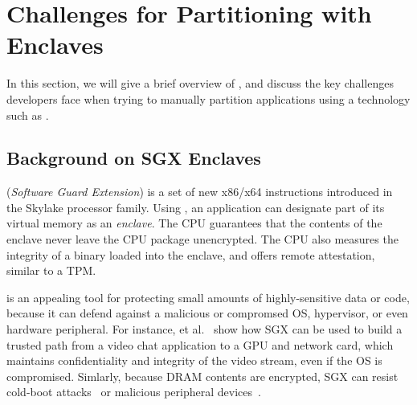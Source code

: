 \section{Challenges for Partitioning with Enclaves}
\label{sec:background}
In this section, we will give a brief overview of \sgx{}, and discuss 
the key challenges developers face when trying to manually partition applications using a technology such as \sgx{}.

\subsection{Background on \intel{} SGX Enclaves}

\intel{} \sgx{} ({\it Software Guard Extension})
is a set of new x86/x64 instructions
introduced in the \intel{} Skylake processor family.
Using \sgx{}, an 
application can designate part of its virtual memory as an {\em enclave}.
The CPU guarantees that the contents of the enclave never leave the CPU package unencrypted.
The CPU also measures the integrity of a binary loaded into the enclave, and offers remote attestation,
similar to a TPM.


\sgx{} is an appealing tool for protecting small amounts of highly-sensitive data or code, because it can defend 
against a malicious or compromsed OS, hypervisor, or even hardware peripheral.
For instance,  et al.~ show how SGX can be used
to build a trusted path from a video chat application to a GPU and network card, which maintains confidentiality and integrity of the
video stream, even if the OS is compromised.
Simlarly, because DRAM contents are encrypted, SGX can resist cold-boot attacks~\cite{halderman09coldboot} or 
malicious peripheral devices~\cite{hudson15thunderstrike}.



